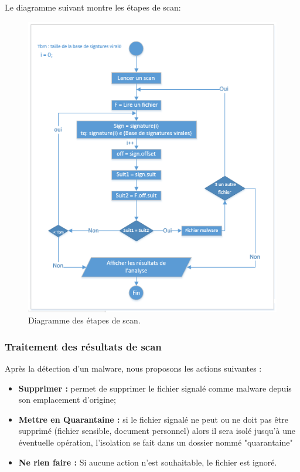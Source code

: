 Le diagramme suivant montre les étapes de scan:
\begin{figure}[H]
\begin{center}
\includegraphics[scale=1]{Figures/scans.jpg}
\caption{Diagramme des étapes de scan.}
\label{fig :mise} 
\end{center}
\end{figure}
\subsubsection{Traitement des résultats de scan }

Après la détection d'un malware, nous proposons les actions suivantes :
\begin{itemize}
\item \textbf{Supprimer : }permet de supprimer le fichier signalé comme malware depuis son emplacement d'origine;  
\item \textbf{Mettre en Quarantaine : }si le fichier signalé ne peut ou ne doit pas être supprimé (fichier sensible, document personnel) alors il sera isolé jusqu'à une éventuelle opération, l'isolation se fait dans un dossier nommé  "quarantaine" 
\item \textbf{Ne rien faire : }Si aucune action n'est souhaitable, le fichier est ignoré.\\
\end{itemize} 
